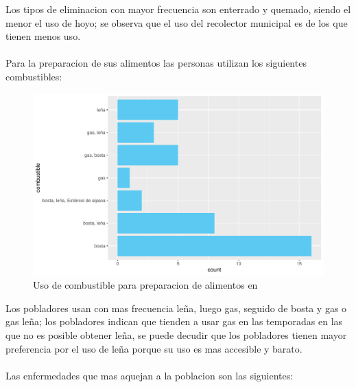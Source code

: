 \documentclass[12pt]{article}\usepackage[]{graphicx}\usepackage[]{xcolor}
\makeatletter
\def\maxwidth{ %
  \ifdim\Gin@nat@width>\linewidth
    \linewidth
  \else
    \Gin@nat@width
  \fi
}
\newenvironment{knitrout}{}{} %
\makeatother
\begin{document}
	Los tipos de eliminacion con mayor frecuencia son enterrado y quemado, siendo el menor el uso de hoyo; se observa que el uso del recolector municipal es de los que tienen menos uso.\\
	\\
	Para la preparacion de sus alimentos las personas utilizan los siguientes combustibles:
	\begin{figure}[H]
	\centering
\begin{knitrout}
\color{fgcolor}
\includegraphics[width=\maxwidth]{figure/ocho-1} 
\end{knitrout}
	\caption{Uso de combustible para preparacion de alimentos en \comunidad}
	\end{figure}
	Los pobladores usan con mas frecuencia leña, luego gas, seguido de bosta y gas o gas leña; los pobladores indican que tienden a usar gas en las temporadas en las que no es posible obtener leña, se puede decudir que los pobladores tienen mayor preferencia por el uso de leña porque su uso es mas accesible y barato.\\
	\\
	Las enfermedades que mas aquejan a la poblacion son las siguientes:
\end{document}
